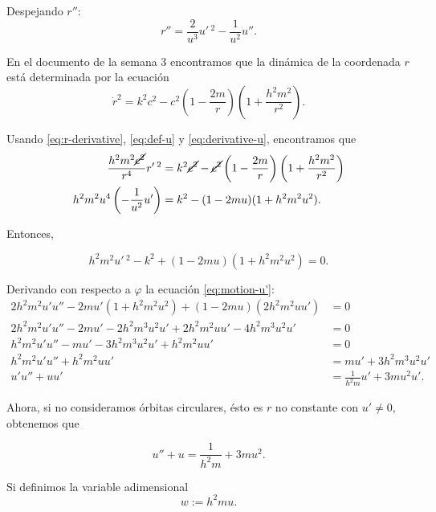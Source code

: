 \documentclass[letterpaper,11pt]{article}
\begin{document}
Despejando $r''$:
\begin{equation} \label{eq:2nd-derivative-u}
r'' = \frac{2}{u^3} u'\,^2 - \frac{1}{u^2} u''.
\end{equation}

En el documento de la semana 3 encontramos que la dinámica de la coordenada $r$ está determinada por la ecuación
\begin{equation}
\dot{r}^2 = k^2c^2 - c^2 \left(1 - \frac{2m}{r}\right)\left(1 + \frac{h^2m^2}{r^2}\right).
\end{equation}

Usando \eqref{eq:r-derivative}, \eqref{eq:def-u} y \eqref{eq:derivative-u}, encontramos que 
\begin{align}
\frac{h^2m^2\cancel{c^2}}{r^4} r'\,^2 &= k^2\cancel{c^2} - \cancel{c^2} \left(1 - \frac{2m}{r} \right)\left(1 + \frac{h^2m^2}{r^2}\right) \\
h^2m^2u^4 \left(-\frac{1}{u^2} u' \right) &= k^2 - (1-2mu)(1+h^2m^2u^2). 
\end{align} 

Entonces,
\begin{shaded}
\begin{equation} \label{eq:motion-u'}
h^2m^2u'\,^2 - k^2 + (1-2mu)(1+h^2m^2u^2) = 0.
\end{equation}
\end{shaded}

Derivando con respecto a $\varphi$ la ecuación \eqref{eq:motion-u'}:
\begin{align}
2h^2m^2u' u'' - 2mu' (1+h^2m^2u^2) + (1-2mu)(2h^2m^2uu') &= 0 \\
2h^2m^2u' u'' - 2mu' - 2h^2m^3u^2u' + 2h^2m^2uu' - 4h^2m^3u^2u' &= 0 \\
h^2m^2 u' u'' - m u' - 3h^2m^3 u^2 u' + h^2m^2 u u' &= 0 \\
h^2m^2 u' u'' + h^2m^2 u u' &=  m u' + 3h^2m^3 u^2 u' \\
 u' u'' +  u u' &=  \frac{1}{h^2 m} u' + 3m u^2 u'.
\end{align}

Ahora, si no consideramos órbitas circulares, ésto es $r$ no constante con $u' \neq 0$, obtenemos que
\begin{shaded}
\begin{equation} \label{eq:motion-u''}
u'' + u = \frac{1}{h^2m} + 3mu^2.
\end{equation}
\end{shaded}

Si definimos la variable adimensional
\begin{equation}
w := h^2m u.
\end{equation}
\end{document}
